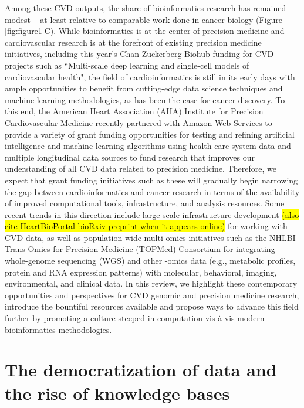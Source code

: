 \documentclass[letter]{bioinfo}
\begin{document}
Among these CVD outputs, the share of bioinformatics research has remained modest -- at least relative to comparable work done in cancer biology (Figure \ref{fig:figure1}C). While bioinformatics is at the center of precision medicine \citep{Gomez-Lopez:2017:Precision} and cardiovascular research is at the forefront of existing precision medicine initiatives, including this year's Chan Zuckerberg Biohub funding for CVD projects such as ``Multi-scale deep learning and single-cell models of cardiovascular health", the field of cardioinformatics is still in its early days with ample opportunities to benefit from cutting-edge data science techniques and machine learning methodologies, as has been the case for cancer discovery.  To this end, the American Heart Association (AHA) Institute for Precision Cardiovascular Medicine recently partnered with Amazon Web Services to provide a variety of grant funding opportunities for testing and refining artificial intelligence and machine learning algorithms using health care system data and multiple longitudinal data sources to fund research that improves our understanding of all CVD data related to precision medicine.  Therefore, we expect that grant funding initiatives such as these will gradually begin narrowing the gap between cardioinformatics and cancer research in terms of the availability of improved computational tools, infrastructure, and analysis resources.  Some recent trends in this direction include large-scale infrastructure development \citep{Kass-Hout:2018:American} \hl{(also cite HeartBioPortal bioRxiv preprint when it appears online)} for working with CVD data, as well as population-wide multi-omics initiatives such as the NHLBI Trans-Omics for Precision Medicine (TOPMed) Consortium for integrating whole-genome sequencing (WGS) and other -omics data (e.g., metabolic profiles, protein and RNA expression patterns) with molecular, behavioral, imaging, environmental, and clinical data.  In this review, we highlight these contemporary opportunities and perspectives for CVD genomic and precision medicine research, introduce the bountiful resources available and propose ways to advance this field further by promoting a culture steeped in computation vis-\`{a}-vis modern bioinformatics methodologies.


\section*{The democratization of data and the rise of knowledge bases}
\end{document}
